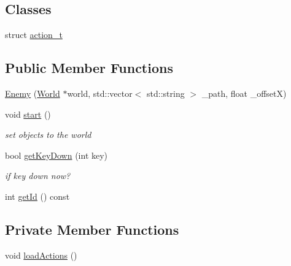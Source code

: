 \subsection*{Classes}
\begin{DoxyCompactItemize}
\item 
struct \hyperlink{structEnemy_1_1action__t}{action\+\_\+t}
\end{DoxyCompactItemize}
\subsection*{Public Member Functions}
\begin{DoxyCompactItemize}
\item 
\hyperlink{classEnemy_a05371b05fdaf447e2811a74e64dd3cf5}{Enemy} (\hyperlink{classWorld}{World} $\ast$world, std\+::vector$<$ std\+::string $>$ \+\_\+path, float \+\_\+offset\+X)
\item 
void \hyperlink{classEnemy_a71641016b8ea6de06deeda6926600da8}{start} ()
\begin{DoxyCompactList}\small\item\em set objects to the world \end{DoxyCompactList}\item 
bool \hyperlink{classEnemy_ac96f56669570d7acf7d53cf21e13b639}{get\+Key\+Down} (int key)
\begin{DoxyCompactList}\small\item\em if key down now? \end{DoxyCompactList}\item 
int \hyperlink{classEnemy_ad24d8afab5f4f150d7bb87ec96baf84d}{get\+Id} () const 
\end{DoxyCompactItemize}
\subsection*{Private Member Functions}
\begin{DoxyCompactItemize}
\item 
void \hyperlink{classEnemy_adc988b4e145e0d2d88d66c39f19cea9a}{load\+Actions} ()
\end{DoxyCompactItemize}
